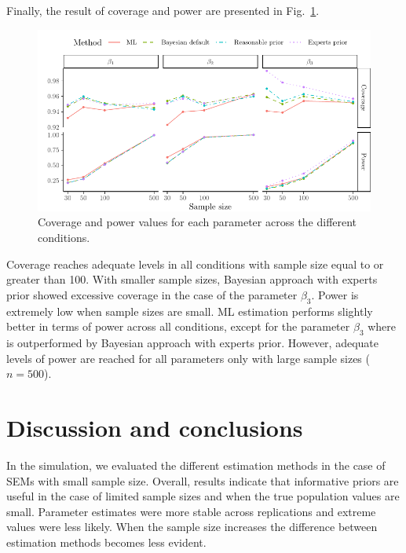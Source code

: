 \documentclass[graybox]{svmult}
\begin{document}
Finally, the result of coverage and power are presented in Fig.~\ref{fig:Plot_coverage_power}.
\begin{figure}[t]
	\sidecaption
	\includegraphics[width = .75\textwidth]{figure/Plot_coverage_power}
	\caption{Coverage and power values for each parameter across the different conditions.}
	\label{fig:Plot_coverage_power}
\end{figure}
Coverage reaches adequate levels in all conditions  with sample size  equal to or greater than 100. With smaller sample sizes, Bayesian approach with experts prior showed excessive coverage in the case of the parameter $\beta_3$. Power is extremely low when sample sizes are small. ML estimation performs slightly better in terms of power across all conditions, except for the  parameter $\beta_3$ where is outperformed by Bayesian approach with experts prior. However, adequate levels of power are reached for all parameters only with large sample sizes ($n = 500$).

\section{Discussion and conclusions}

\label{sec:dicussion}


In the simulation, we evaluated the different estimation methods in the case of SEMs with small sample size. Overall, results indicate that informative priors are useful in the case of limited sample sizes and when the true population values are small. Parameter estimates were more stable  across replications and extreme values were less likely. When the sample size increases the difference between estimation methods becomes less evident.
\end{document}
